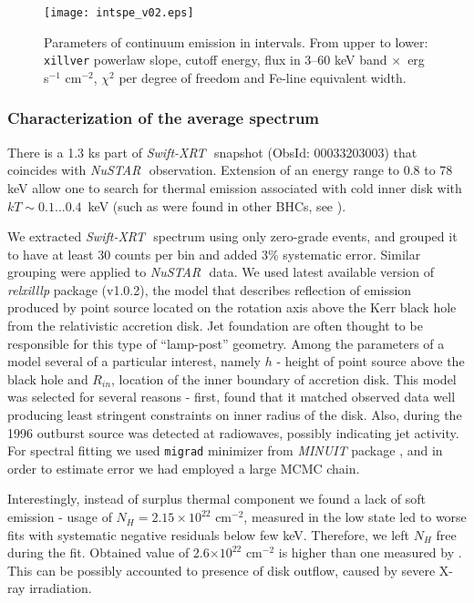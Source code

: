 \documentclass[a4paper,fleqn,usenatbib]{mnras}
\def\swiftx{{\em Swift-XRT\,}}
\def\nustar{{\em NuSTAR\,}}
\begin{document}
\begin{figure}
\centerline{\texttt{[image: intspe\_v02.eps]}}
\caption{Parameters of continuum emission in intervals. From upper to lower: \texttt{xillver} powerlaw slope, cutoff energy,  flux in 3--60 keV band $\times$\, erg s$^{-1}$ cm$^{-2}$, $\chi^{2}$ per degree of freedom and Fe-line equivalent width.} 
\label{fig:intspe}
\end{figure}  
            
\subsubsection{Characterization of the average spectrum}            
There is a 1.3 ks part of \swiftx\, snapshot (ObsId: 00033203003) that coincides with \nustar\, observation. Extension of an energy range to 0.8 to 78 keV allow one to search for thermal emission associated with cold inner disk with $kT \sim 0.1...0.4$~keV (such as were found in other BHCs, see \cite[][ e.t.c]{miller06b,miller06a,parker15}).

We extracted \swiftx\, spectrum using only zero-grade events, and grouped it to have at least 30 counts per bin and added 3\% systematic error. Similar grouping were applied to \nustar\, data. We used latest available version of {\it relxilllp} package (v1.0.2), the model that describes reflection of emission produced by point source located on the rotation axis above the Kerr black hole from the relativistic accretion disk. Jet foundation are often thought to be responsible for this type of ``lamp-post'' geometry. Among the parameters of a model several of a particular interest, namely $h$ - height of point source above the black hole and $R_{in}$, location of the inner boundary of accretion disk.  This model was selected for several reasons - first, \cite{miller15_nust} found that it matched observed data well producing least stringent constraints on inner radius of the disk. Also, during the 1996 outburst source was detected at radiowaves, possibly indicating jet activity. For spectral fitting we used \texttt{migrad} minimizer from {\em MINUIT} package \citep{james75minuit}, and in order to estimate error we had employed a large MCMC chain. 

Interestingly, instead of surplus thermal component we found a lack of soft emission - usage of $N_{H} = 2.15\times10^{22}$ cm$^{-2}$, measured in the low state \citep{fuerst16_gx339} led to worse fits with systematic negative residuals below few keV. Therefore, we left $N_{H}$ free during the fit. Obtained value of 2.6$\times10^{22}$ cm$^{-2}$ is higher than one measured by \cite{fuerst16_gx339}. This can be possibly accounted to presence of disk outflow, caused by severe X-ray irradiation. 
\end{document}
